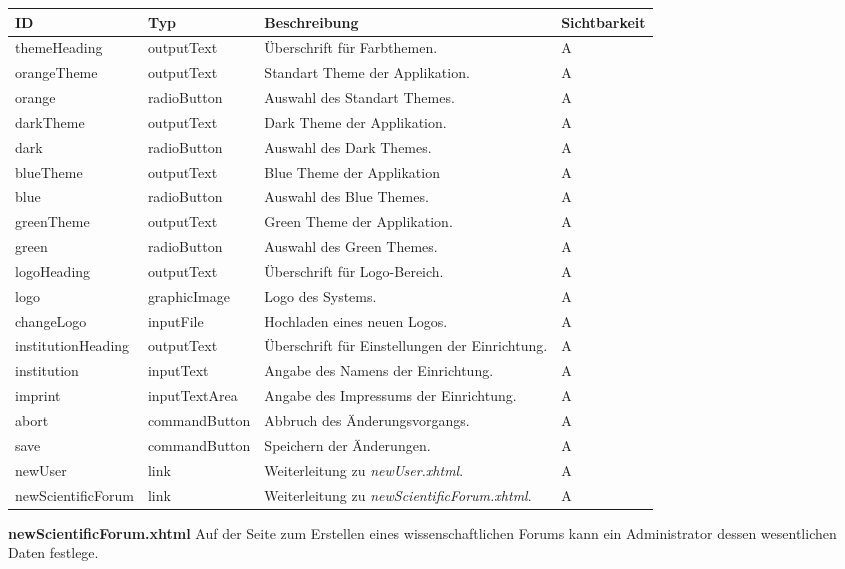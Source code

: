 \begin{tabular}[H]{|m{2cm}|m{3cm}|m{6cm}|m{2.5cm}|}
    \hline
    \textbf{ID} & \textbf{Typ} & \textbf{Beschreibung} & \textbf{Sichtbarkeit} \\
    \hline
    \hline
    themeHeading & outputText & Überschrift für Farbthemen. & A\\
    \hline
    orangeTheme & outputText & Standart Theme der Applikation. & A\\
    \hline
    orange & radioButton & Auswahl des Standart Themes. & A\\
    \hline
    darkTheme & outputText & Dark Theme der Applikation. & A\\
    \hline
    dark & radioButton & Auswahl des Dark Themes. & A\\
    \hline
    blueTheme & outputText & Blue Theme der Applikation & A\\
    \hline
    blue & radioButton & Auswahl des Blue Themes. & A\\
    \hline
    greenTheme & outputText & Green Theme der Applikation. & A\\
    \hline
    green & radioButton & Auswahl des Green Themes. & A\\
    \hline
    logoHeading & outputText & Überschrift für Logo-Bereich. & A\\
    \hline
    logo & graphicImage & Logo des Systems. & A\\
    \hline
    changeLogo & inputFile & Hochladen eines neuen Logos. & A\\
    \hline
    institutionHeading & outputText & Überschrift für Einstellungen der Einrichtung. & A\\
    \hline
    institution & inputText & Angabe des Namens der Einrichtung. & A\\
    \hline
    imprint & inputTextArea & Angabe des Impressums der Einrichtung. & A\\
    \hline
    abort & commandButton & Abbruch des Änderungsvorgangs. & A \\
    \hline
    save & commandButton & Speichern der Änderungen. & A\\
    \hline
    newUser & link & Weiterleitung zu \emph{newUser.xhtml}. & A\\
    \hline
    newScientificForum & link & Weiterleitung zu \emph{newScientificForum.xhtml}. & A\\
    \hline
\end{tabular}

\textbf{newScientificForum.xhtml} Auf der Seite zum Erstellen eines wissenschaftlichen Forums kann ein Administrator dessen wesentlichen Daten festlege.

